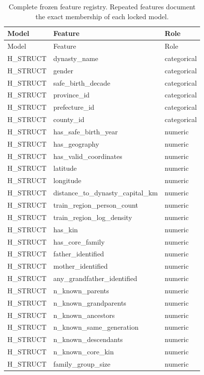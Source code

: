 \begin{longtable}{lll}
\caption{Complete frozen feature registry. Repeated features document the exact membership of each locked model.}\label{tab:app-features}\\
\toprule
Model & Feature & Role \\
\midrule
\endfirsthead
\toprule
Model & Feature & Role \\
\midrule
\endhead
H\_STRUCT & dynasty\_name & categorical \\
H\_STRUCT & gender & categorical \\
H\_STRUCT & safe\_birth\_decade & categorical \\
H\_STRUCT & province\_id & categorical \\
H\_STRUCT & prefecture\_id & categorical \\
H\_STRUCT & county\_id & categorical \\
H\_STRUCT & has\_safe\_birth\_year & numeric \\
H\_STRUCT & has\_geography & numeric \\
H\_STRUCT & has\_valid\_coordinates & numeric \\
H\_STRUCT & latitude & numeric \\
H\_STRUCT & longitude & numeric \\
H\_STRUCT & distance\_to\_dynasty\_capital\_km & numeric \\
H\_STRUCT & train\_region\_person\_count & numeric \\
H\_STRUCT & train\_region\_log\_density & numeric \\
H\_STRUCT & has\_kin & numeric \\
H\_STRUCT & has\_core\_family & numeric \\
H\_STRUCT & father\_identified & numeric \\
H\_STRUCT & mother\_identified & numeric \\
H\_STRUCT & any\_grandfather\_identified & numeric \\
H\_STRUCT & n\_known\_parents & numeric \\
H\_STRUCT & n\_known\_grandparents & numeric \\
H\_STRUCT & n\_known\_ancestors & numeric \\
H\_STRUCT & n\_known\_same\_generation & numeric \\
H\_STRUCT & n\_known\_descendants & numeric \\
H\_STRUCT & n\_known\_core\_kin & numeric \\
H\_STRUCT & family\_group\_size & numeric \\

\end{longtable}
